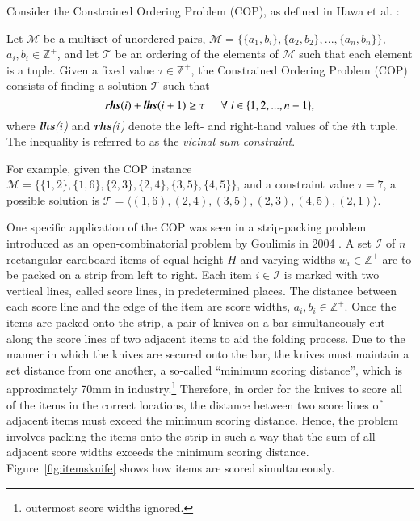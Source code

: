 \documentclass{elsarticle}
\begin{document}
Consider the Constrained Ordering Problem (COP), as defined in Hawa et al. \cite{hawa2018}:
\begin{definition}
	\label{defn:cop}
	Let $\mathcal{M}$ be a multiset of unordered pairs, $\mathcal{M} = \{\{a_1, b_i\}, \{a_2, b_2\},..., \{a_n, b_n\}\}$, $a_i, b_i \in \mathbb{Z}^+$, and let $\mathcal{T}$ be an ordering of the elements of $\mathcal{M}$ such that each element is a tuple. Given a fixed value $\tau \in \mathbb{Z}^+$, the Constrained Ordering Problem (COP) consists of finding a solution $\mathcal{T}$ such that
	\begin{equation}
	\label{eqn:vsc}
	\emph{\textbf{rhs}}(i) + \emph{\textbf{lhs}}(i+1) \geq \tau \hspace{5mm} \forall \hspace{1mm} i \in \{1,2,..., n-1\},
	\end{equation}
	where \emph{\textbf{lhs}($i$)} and \emph{\textbf{rhs}($i$)} denote the left- and right-hand values of the $i$th tuple. The inequality is referred to as the \emph{vicinal sum constraint}.
\end{definition}

For example, given the COP instance $\mathcal{M} = \{\{1,2\}, \{1,6\}, \{2,3\}, \{2,4\}, \{3,5\}, \{4,5\}\}$, and a constraint value $\tau = 7$, a possible solution is $\mathcal{T} = \langle(1,6), (2,4), (3,5), (2,3), (4,5), (2,1)\rangle$. 

One specific application of the COP was seen in a strip-packing problem introduced as an open-combinatorial problem by Goulimis in 2004 \cite{goulimis2004}. A set $\mathcal{I}$ of $n$ rectangular cardboard items of equal height $H$ and varying widths $w_i \in \mathbb{Z}^+$ are to be packed on a strip from left to right. Each item $i \in \mathcal{I}$ is marked with two vertical lines, called score lines, in predetermined places. The distance between each score line and the edge of the item are score widths, $a_i, b_i \in \mathbb{Z}^+$. Once the items are packed onto the strip, a pair of knives on a bar simultaneously cut along the score lines of two adjacent items to aid the folding process. Due to the manner in which the knives are secured onto the bar, the knives must maintain a set distance from one another, a so-called ``minimum scoring distance'', which is approximately 70mm in industry.\footnote{\alert{outermost score widths ignored.}} Therefore, in order for the knives to score all of the items in the correct locations, the distance between two score lines of adjacent items must exceed the minimum scoring distance. Hence, the problem involves packing the items onto the strip in such a way that the sum of all adjacent score widths exceeds the minimum scoring distance. Figure~\ref{fig:itemsknife} shows how items are scored simultaneously.
\end{document}
